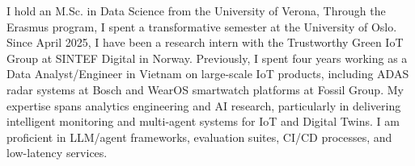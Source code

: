 \par{
    I hold an M.Sc. in Data Science from the University of Verona, Through the Erasmus program, I spent a transformative semester at the University of Oslo. Since April 2025, I have been a research intern with the Trustworthy Green IoT Group at SINTEF Digital in Norway.
    Previously, I spent four years working as a Data Analyst/Engineer in Vietnam on large-scale IoT products, including ADAS radar systems at Bosch and WearOS smartwatch platforms at Fossil Group.
    My expertise spans analytics engineering and AI research, particularly in delivering intelligent monitoring and multi-agent systems for IoT and Digital Twins. I am proficient in LLM/agent frameworks, evaluation suites, CI/CD processes, and low-latency services.
}